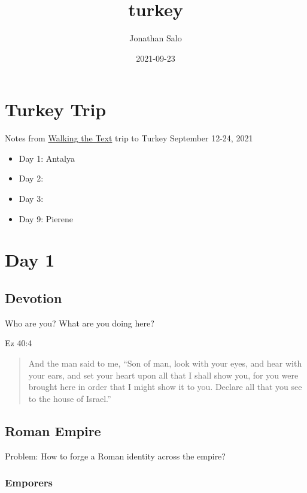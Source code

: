 \documentclass[
]{book}
\title{turkey}
\author{Jonathan Salo}
\date{2021-09-23}
\begin{document}
\maketitle

{
\setcounter{tocdepth}{1}
\tableofcontents
}
\hypertarget{turkey-trip}{%
\chapter{Turkey Trip}\label{turkey-trip}}

Notes from \href{http://walkingthetestcom}{Walking the Text} trip to Turkey September 12-24, 2021

\begin{itemize}
\item
  Day 1: Antalya
\item
  Day 2:
\item
  Day 3:
\item
  Day 9: Pierene
\end{itemize}

\hypertarget{day-1}{%
\chapter{Day 1}\label{day-1}}

\hypertarget{devotion}{%
\section{Devotion}\label{devotion}}

Who are you? What are you doing here?

Ez 40:4

\begin{quote}
And the man said to me, ``Son of man, look with your eyes, and hear with your ears, and set your heart upon all that I shall show you, for you were brought here in order that I might show it to you. Declare all that you see to the house of Israel.''
\end{quote}

\hypertarget{roman-empire}{%
\section{Roman Empire}\label{roman-empire}}

Problem: How to forge a Roman identity across the empire?

\hypertarget{emporers}{%
\subsection{Emporers}\label{emporers}}
\end{document}
